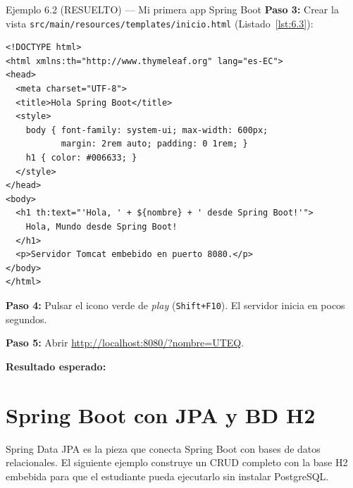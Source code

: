 \documentclass[11pt,a4paper,openany]{book}
\begin{document}
\begin{cajaejemplo}{Ejemplo 6.2 (RESUELTO) --- Mi primera app Spring Boot}
\textbf{Paso 3:} Crear la vista
\texttt{src/main/resources/templates/inicio.html} (Listado~\ref{lst:6.3}):

\begin{lstlisting}[style=html,caption={inicio.html (Thymeleaf)},label=lst:6.3]
<!DOCTYPE html>
<html xmlns:th="http://www.thymeleaf.org" lang="es-EC">
<head>
  <meta charset="UTF-8">
  <title>Hola Spring Boot</title>
  <style>
    body { font-family: system-ui; max-width: 600px;
           margin: 2rem auto; padding: 0 1rem; }
    h1 { color: #006633; }
  </style>
</head>
<body>
  <h1 th:text="'Hola, ' + ${nombre} + ' desde Spring Boot!'">
    Hola, Mundo desde Spring Boot!
  </h1>
  <p>Servidor Tomcat embebido en puerto 8080.</p>
</body>
</html>
\end{lstlisting}

\textbf{Paso 4:} Pulsar el icono verde de \emph{play}
(\texttt{Shift+F10}). El servidor inicia en pocos segundos.

\textbf{Paso 5:} Abrir \url{http://localhost:8080/?nombre=UTEQ}.

\textbf{Resultado esperado:}

\end{cajaejemplo}

\section{Spring Boot con JPA y BD H2}

Spring Data JPA es la pieza que conecta Spring Boot con bases
de datos relacionales. El siguiente ejemplo construye un CRUD
completo con la base H2 embebida para que el estudiante pueda
ejecutarlo sin instalar PostgreSQL.
\end{document}
